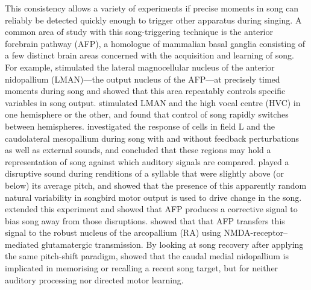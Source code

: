 \documentclass[10pt,letterpaper]{article}
\begin{document}
This consistency allows a variety of experiments if precise moments in
song can reliably be detected quickly enough to trigger other
apparatus during singing.  A common area of study with this
song-triggering technique is the anterior forebrain pathway (AFP), a
homologue of mammalian basal ganglia consisting of a few distinct
brain areas concerned with the acquisition and learning of song.  For
example, \cite{Kao2005} stimulated the lateral magnocellular nucleus
of the anterior nidopallium (LMAN)---the output nucleus of the
AFP---at precisely timed moments during song and showed that this area
repeatably controls specific variables in song output.
\cite{Wang2008interhemispheric} stimulated LMAN and the high vocal
centre (HVC) in one hemisphere or the other, and found that control of
song rapidly switches between hemispheres.  \cite{Keller2009}
investigated the response of cells in field L and the caudolateral
mesopallium during song with and without feedback perturbations as
well as external sounds, and concluded that these regions may hold a
representation of song against which auditory signals are compared.
\cite{Tumer2007pitchshift} played a disruptive sound during renditions of a syllable that were
slightly above (or below) its average pitch, and showed that the
presence of this apparently random natural variability in songbird
motor output is used to drive change in the song.  \cite{Andalman2009}
extended this experiment and showed that AFP produces a corrective
signal to bias song away from those disruptions.  \cite{Warren2011}
showed that that AFP transfers this signal to the robust nucleus of
the arcopallium (RA) using NMDA-receptor--mediated glutamatergic
transmission. By looking at song recovery after applying the same
pitch-shift paradigm, \cite{Canopoli2014} showed that the caudal
medial nidopallium is implicated in memorising or recalling a recent
song target, but for neither auditory processing nor directed motor
learning.

\end{document}
